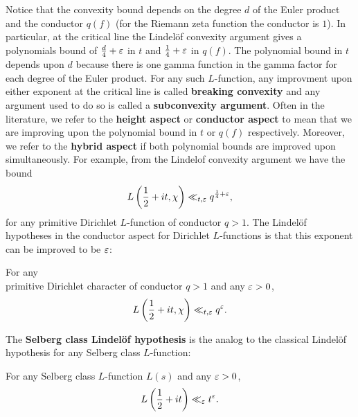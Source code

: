     Notice that the convexity bound depends on the degree $d$ of the Euler product and the conductor $q(f)$ (for the Riemann zeta function the conductor is $1$). In particular, at the critical line the Lindel\"of convexity argument gives a polynomials bound of $\frac{d}{4}+\varepsilon$ in $t$ and $\frac{1}{4}+\varepsilon$ in $q(f)$. The polynomial bound in $t$ depends upon $d$ because there is one gamma function in the gamma factor for each degree of the Euler product. For any such $L$-function, any improvment upon either exponent at the critical line is called \textbf{breaking convexity} and any argument used to do so is called a \textbf{subconvexity argument}. Often in the literature, we refer to the \textbf{height aspect} or \textbf{conductor aspect} to mean that we are improving upon the polynomial bound in $t$ or $q(f)$ respectively. Moreover, we refer to the \textbf{hybrid aspect} if both polynomial bounds are improved upon simultaneously. For example, from the Lindelof convexity argument we have the bound
    \[
      L\left(\frac{1}{2}+it,\chi\right) \ll_{t,\varepsilon} q^{\frac{1}{4}+\varepsilon},
    \]
    for any primitive Dirichlet $L$-function of conductor $q > 1$. The Lindel\"of hypotheses in the conductor aspect for Dirichlet $L$-functions is that this exponent can be improved to be $\varepsilon$:

    \begin{conjecture}
      For any \\ primitive Dirichlet character of conductor $q > 1$ and any $\varepsilon > 0$,
      \[
        L\left(\frac{1}{2}+it,\chi\right) \ll_{t,\varepsilon} q^{\varepsilon}.
      \]
    \end{conjecture}
    
     The \textbf{Selberg class Lindel\"of hypothesis} is the analog to the classical Lindel\"of hypothesis for any Selberg class $L$-function:

    \begin{conjecture}
      For any Selberg class $L$-function $L(s)$ and any $\varepsilon > 0$,
      \[
        L\left(\frac{1}{2}+it\right) \ll_{\varepsilon} t^{\varepsilon}.
      \]
    \end{conjecture}